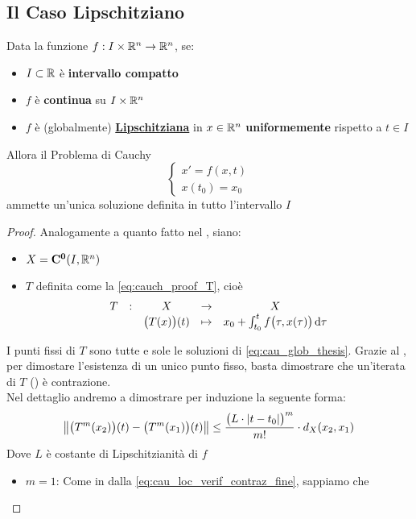 \subsection{Il Caso Lipschitziano}
\begin{theorem}
	\label{teo:cau_glob_lips}
	Data la funzione $f:I \times \mathbb{R}^n \to \mathbb{R}^n$, se:
	\begin{itemize}[noitemsep]
		\item $I \subset \mathbb{R}$ è \textbf{intervallo compatto}
		\item $f$ è \textbf{continua} su $I \times \mathbb{R}^n$
		\item $f$ è (globalmente) \hyperref[def:lips]{\textbf{Lipschitziana}} in $x \in \mathbb{R}^n$ \textbf{uniformemente} rispetto a $t \in I$
	\end{itemize}
	Allora il Problema di Cauchy
	\begin{equation}
		\label{eq:cau_glob_thesis}
		\begin{cases}
			x' = f(x,t)\\
			x(t_0) = x_0
		\end{cases}
	\end{equation}
	ammette un'unica soluzione definita in tutto l'intervallo $I$
	\begin{proof}
		Analogamente a quanto fatto nel , siano:
		\begin{itemize}[noitemsep]
			\item $X = \mathbf{C^{0}}(I,\mathbb{R}^n)$
			\item $T$ definita come la \cref{eq:cauch_proof_T}, cioè
			\[\begin{array}{ccccc} {T} & : & {X} & \to & {X} \\ & & { \bigl(T(x)\bigr)(t) } & \mapsto & { x_0+\int_{t_0}^tf\bigl(\tau,x(\tau)\bigr)\,\mathrm{d}{\tau} } \\ \end{array}\]
		\end{itemize}
		I punti fissi di $T$ sono tutte e sole le soluzioni di \cref{eq:cau_glob_thesis}. Grazie al , per dimostare l'esistenza di un unico punto fisso, basta dimostrare che un'iterata di $T$ () è contrazione.\\
		Nel dettaglio andremo a dimostrare per induzione la seguente forma:
		\[\left\|\bigl(T^m(x_2)\bigr)(t) - \bigl(T^m(x_1)\bigr)(t)\right\| \leq \frac{\bigl(L \cdot \left|t-t_0\right|\bigr)^m}{m!} \cdot d_X(x_2,x_1)\]
		Dove $L$ è costante di Lipschitzianità di $f$
		\begin{itemize}
			\item $m=1$: Come in dalla \cref{eq:cau_loc_verif_contraz_fine}, sappiamo che
			\begin{equation*}

\end{equation*}
\end{itemize}
\end{proof}
\end{theorem}
